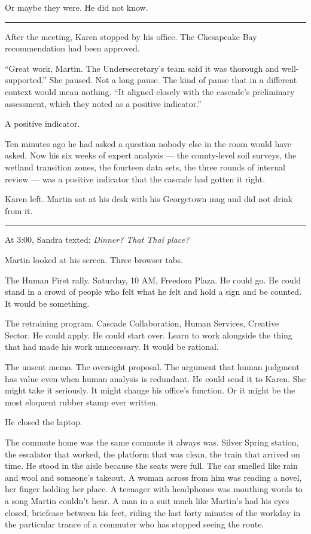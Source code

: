 Or maybe they were. He did not know.

\begin{center}\rule{0.3\linewidth}{0.4pt}\end{center}

After the meeting, Karen stopped by his office. The Chesapeake Bay recommendation had been approved.

``Great work, Martin. The Undersecretary's team said it was thorough and well-supported.'' She paused. Not a long pause. The kind of pause that in a different context would mean nothing. ``It aligned closely with the cascade's preliminary assessment, which they noted as a positive indicator.''

A positive indicator.

Ten minutes ago he had asked a question nobody else in the room would have asked. Now his six weeks of expert analysis --- the county-level soil surveys, the wetland transition zones, the fourteen data sets, the three rounds of internal review --- was a positive indicator that the cascade had gotten it right.

Karen left. Martin sat at his desk with his Georgetown mug and did not drink from it.

\begin{center}\rule{0.3\linewidth}{0.4pt}\end{center}

At 3:00, Sandra texted: \emph{Dinner? That Thai place?}

Martin looked at his screen. Three browser tabs.

The Human First rally. Saturday, 10 AM, Freedom Plaza. He could go. He could stand in a crowd of people who felt what he felt and hold a sign and be counted. It would be something.

The retraining program. Cascade Collaboration, Human Services, Creative Sector. He could apply. He could start over. Learn to work alongside the thing that had made his work unnecessary. It would be rational.

The unsent memo. The oversight proposal. The argument that human judgment has value even when human analysis is redundant. He could send it to Karen. She might take it seriously. It might change his office's function. Or it might be the most eloquent rubber stamp ever written.

He closed the laptop.

The commute home was the same commute it always was. Silver Spring station, the escalator that worked, the platform that was clean, the train that arrived on time. He stood in the aisle because the seats were full. The car smelled like rain and wool and someone's takeout. A woman across from him was reading a novel, her finger holding her place. A teenager with headphones was mouthing words to a song Martin couldn't hear. A man in a suit much like Martin's had his eyes closed, briefcase between his feet, riding the last forty minutes of the workday in the particular trance of a commuter who has stopped seeing the route.

